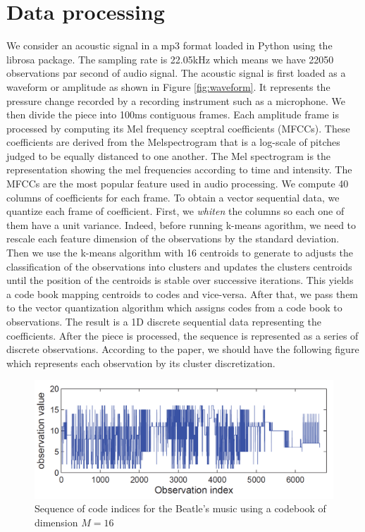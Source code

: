 \section{Data processing}
We consider an acoustic signal in a mp3 format loaded in Python using the librosa package. The sampling rate is 22.05kHz which means we have 22050 observations par second of audio signal. The acoustic signal is first loaded as a waveform or amplitude as shown in Figure \ref{fig:waveform}. It represents the pressure change recorded by a recording instrument such as a microphone. We then divide the piece into 100ms contiguous frames. Each amplitude frame is processed by computing its Mel frequency sceptral coefficients (MFCCs). These coefficients are derived from the Melspectrogram that is a log-scale of pitches judged to be equally distanced to one another. The Mel spectrogram is the representation showing the mel frequencies according to time and intensity. The MFCCs are the most popular feature used in audio processing. We compute 40 columns of coefficients for each frame. To obtain a vector sequential data, we quantize each frame of coefficient. First, we \textit{whiten} the columns so each one of them have a unit variance. Indeed, before running k-means agorithm, we need to rescale each feature dimension of the observations by the standard deviation. Then we use the k-means algorithm with 16 centroids to generate to adjusts the classification of the observations into clusters and updates the clusters centroids until the position of the centroids is stable over successive iterations. This yields a code book mapping centroids to codes and vice-versa. After that, we pass them to the vector quantization algorithm which assigns codes from a code book to observations. The result is a 1D discrete sequential data representing the coefficients. After the piece is processed, the sequence is represented as a series of discrete observations. According to the paper, we should have the following figure which represents each observation by its cluster discretization. 
\begin{figure}[h]
    \label{fig:output}
    \centering
  	\includegraphics[scale=0.25]{Graphics/output.PNG} 
   	\caption{Sequence of code indices for the Beatle's music using a codebook of dimension $M = 16$}
\end{figure}

